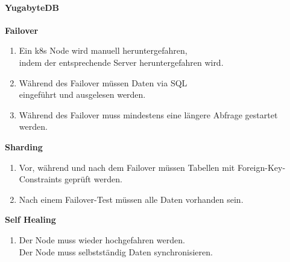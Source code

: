 \begin{flushleft}
    \paragraph{YugabyteDB}
    \begin{description}
        \item \textbf{Failover}\hfill \\
        \begin{enumerate}
            \item Ein k8s Node wird manuell heruntergefahren,\\indem der entsprechende Server heruntergefahren wird.
            \item Während des Failover müssen Daten via SQL\\eingeführt und ausgelesen werden.
            \item Während des Failover muss mindestens eine längere Abfrage gestartet werden.
        \end{enumerate}
        \item \textbf{Sharding}\hfill \\
        \begin{enumerate}[resume]
            \item Vor, während und nach dem Failover müssen Tabellen mit Foreign-Key-Constraints geprüft werden.
            \item Nach einem Failover-Test müssen alle Daten vorhanden sein.
        \end{enumerate}
        \item \textbf{Self Healing}\hfill \\
        \begin{enumerate}[resume]
            \item Der Node muss wieder hochgefahren werden.\\Der Node muss selbstständig Daten synchronisieren.
        \end{enumerate}
    \end{description}
\end{flushleft}
